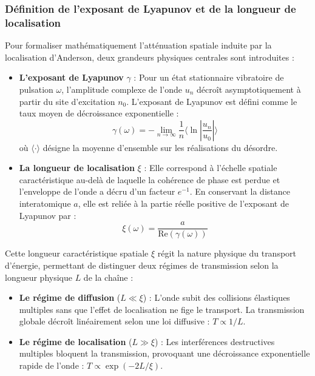 \subsubsection{Définition de l'exposant de Lyapunov et de la longueur de localisation}
Pour formaliser mathématiquement l'atténuation spatiale induite par la localisation d'Anderson, deux grandeurs physiques centrales sont introduites :
\begin{itemize}
    \item \textbf{L'exposant de Lyapunov} $\gamma$ : Pour un état stationnaire vibratoire de pulsation $\omega$, l'amplitude complexe de l'onde $u_n$ décroît asymptotiquement à partir du site d'excitation $n_0$. L'exposant de Lyapunov est défini comme le taux moyen de décroissance exponentielle :
    \begin{equation}
        \gamma(\omega) = - \lim_{n \to \infty} \frac{1}{n} \langle \ln |\frac{u_n}{u_0}| \rangle
        \label{eq:lyapunov_def_th}
    \end{equation}
    où $\langle \cdot \rangle$ désigne la moyenne d'ensemble sur les réalisations du désordre.
    \item \textbf{La longueur de localisation} $\xi$ : Elle correspond à l'échelle spatiale caractéristique au-delà de laquelle la cohérence de phase est perdue et l'enveloppe de l'onde a décru d'un facteur $e^{-1}$. En conservant la distance interatomique $a$, elle est reliée à la partie réelle positive de l'exposant de Lyapunov par :
    \begin{equation}
        \xi(\omega) = \frac{a}{\text{Re}(\gamma(\omega))}
        \label{eq:loc_len_def_th}
    \end{equation}
\end{itemize}

Cette longueur caractéristique spatiale $\xi$ régit la nature physique du transport d'énergie, permettant de distinguer deux régimes de transmission selon la longueur physique $L$ de la chaîne :

\begin{itemize}
    \item \textbf{Le régime de diffusion} ($L \ll \xi$) : L'onde subit des collisions élastiques multiples sans que l'effet de localisation ne fige le transport. La transmission globale décroît linéairement selon une loi diffusive : $T \propto 1/L$.
    \item \textbf{Le régime de localisation} ($L \gg \xi$) : Les interférences destructives multiples bloquent la transmission, provoquant une décroissance exponentielle rapide de l'onde : $T \propto \exp(-2L/\xi)$.
\end{itemize}

